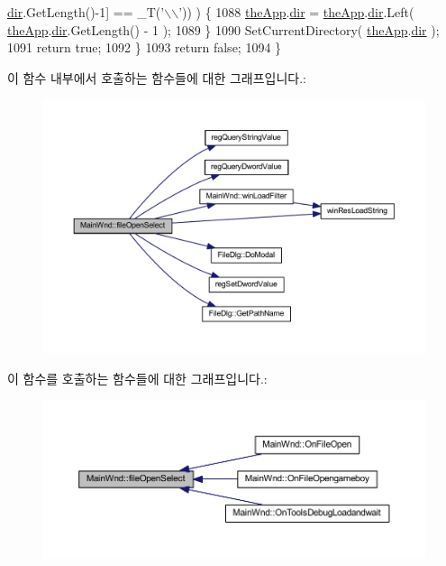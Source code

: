 \begin{DoxyCode}
      \mbox{\hyperlink{class_v_b_a_a7177c0b51e84b91c6027ea73461c457e}{dir}}.GetLength()-1] == \_T(\textcolor{charliteral}{'\(\backslash\)\(\backslash\)'})) ) \{
1088             \mbox{\hyperlink{_v_b_a_8cpp_a8095a9d06b37a7efe3723f3218ad8fb3}{theApp}}.\mbox{\hyperlink{class_v_b_a_a7177c0b51e84b91c6027ea73461c457e}{dir}} = \mbox{\hyperlink{_v_b_a_8cpp_a8095a9d06b37a7efe3723f3218ad8fb3}{theApp}}.\mbox{\hyperlink{class_v_b_a_a7177c0b51e84b91c6027ea73461c457e}{dir}}.Left( \mbox{\hyperlink{_v_b_a_8cpp_a8095a9d06b37a7efe3723f3218ad8fb3}{theApp}}.\mbox{\hyperlink{class_v_b_a_a7177c0b51e84b91c6027ea73461c457e}{dir}}.GetLength() - 1 );
1089         \}
1090         SetCurrentDirectory( \mbox{\hyperlink{_v_b_a_8cpp_a8095a9d06b37a7efe3723f3218ad8fb3}{theApp}}.\mbox{\hyperlink{class_v_b_a_a7177c0b51e84b91c6027ea73461c457e}{dir}} );
1091         \textcolor{keywordflow}{return} \textcolor{keyword}{true};
1092     \}
1093     \textcolor{keywordflow}{return} \textcolor{keyword}{false};
1094 \}
\end{DoxyCode}
이 함수 내부에서 호출하는 함수들에 대한 그래프입니다.\+:
\nopagebreak
\begin{figure}[H]
\begin{center}
\leavevmode
\includegraphics[width=350pt]{class_main_wnd_a872b497a88ca77012694cc909c62e6e4_cgraph}
\end{center}
\end{figure}
이 함수를 호출하는 함수들에 대한 그래프입니다.\+:
\nopagebreak
\begin{figure}[H]
\begin{center}
\leavevmode
\includegraphics[width=350pt]{class_main_wnd_a872b497a88ca77012694cc909c62e6e4_icgraph}
\end{center}
\end{figure}
\mbox{\label{class_main_wnd_a946cd4793215a424eb736af418ccbc3d}} 
